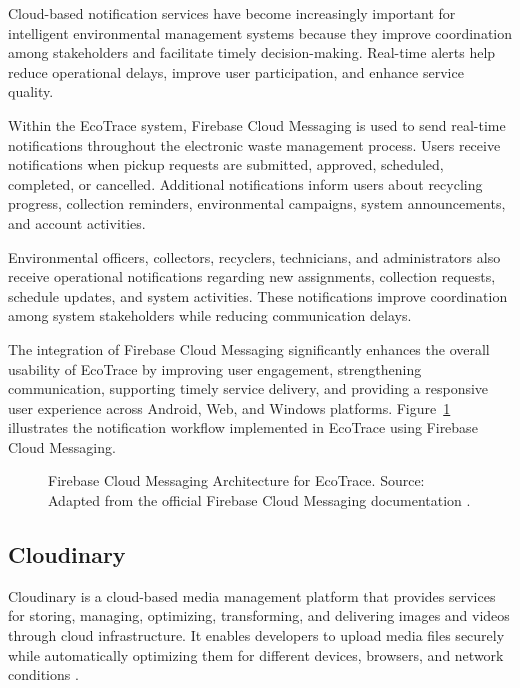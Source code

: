Cloud-based notification services have become increasingly important for
intelligent environmental management systems because they improve coordination
among stakeholders and facilitate timely decision-making. Real-time alerts help
reduce operational delays, improve user participation, and enhance service quality.

Within the EcoTrace system, Firebase Cloud Messaging is used to send
real-time notifications throughout the electronic waste management process.
Users receive notifications when pickup requests are submitted, approved,
scheduled, completed, or cancelled. Additional notifications inform users about
recycling progress, collection reminders, environmental campaigns, system
announcements, and account activities.

Environmental officers, collectors, recyclers, technicians, and administrators
also receive operational notifications regarding new assignments, collection
requests, schedule updates, and system activities. These notifications improve
coordination among system stakeholders while reducing communication delays.

The integration of Firebase Cloud Messaging significantly enhances the overall
usability of EcoTrace by improving user engagement, strengthening
communication, supporting timely service delivery, and providing a responsive
user experience across Android, Web, and Windows platforms.
Figure~\ref{fig:fcm-arch} illustrates the notification workflow implemented in
EcoTrace using Firebase Cloud Messaging.

\begin{figure}[H]
  \centering
  \caption{Firebase Cloud Messaging Architecture for EcoTrace. Source: Adapted from the official Firebase Cloud Messaging documentation \citep{firebase2025fcm}.}
  \label{fig:fcm-arch}
\end{figure}

\subsection{Cloudinary}

Cloudinary is a cloud-based media management platform that provides services for
storing, managing, optimizing, transforming, and delivering images and videos
through cloud infrastructure. It enables developers to upload media files securely
while automatically optimizing them for different devices, browsers, and network
conditions \citep{cloudinary2025}.

